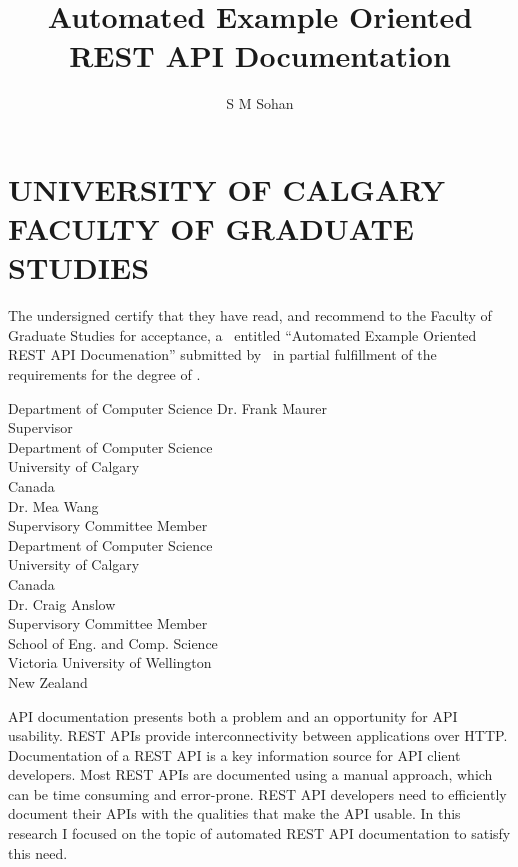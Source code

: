 \documentclass[12pt]{ucalgthes1}
\title{Automated Example Oriented REST API Documentation}
\author{S M Sohan}
\newcommand{\thesistitle}{Automated Example Oriented REST API Documenation}
\begin{document}
\makethesistitle
{}     %
\setcounter{page}{2}
\chapter*{UNIVERSITY OF CALGARY \\ FACULTY OF GRADUATE STUDIES}
\thispagestyle{empty}
The undersigned certify that they have read, and recommend
to the Faculty of Graduate Studies for acceptance, a \Thesis\ entitled
``\thesistitle'' submitted by \Author\
in partial fulfillment of the requirements for the degree of
\Degree.\\

%
%
\begin{signing}{Department of Computer Science}
\signline
Dr. Frank Maurer \\
Supervisor\\
Department of Computer Science \\
University of Calgary \\
Canada\\
\signline
Dr. Mea Wang\\
Supervisory Committee Member\\
Department of Computer Science \\
University of Calgary \\
Canada\\
\signline
Dr. Craig Anslow\\
Supervisory Committee Member\\
School of Eng. and Comp. Science \\
Victoria University of Wellington\\
New Zealand\\
\end{signing}
%
\newpage
{}
{}
API documentation presents both a problem and an opportunity for API usability. REST APIs provide interconnectivity between applications over HTTP. Documentation of a REST API is a key information source for API client developers. Most REST APIs are documented using a manual approach, which can be time consuming and error-prone. REST API developers need to efficiently document their APIs with the qualities that make the API usable. In this research I focused on the topic of automated REST API documentation to satisfy this need.
\end{document}
